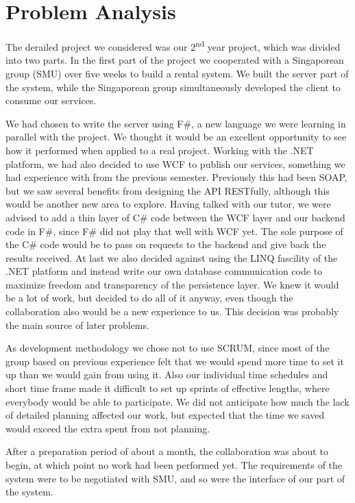 \section{Problem Analysis}
The derailed project we considered was our 2\textsuperscript{nd} year project, which was divided into two parts. In the first part of the project we cooperated with a Singaporean group (SMU) over five weeks to build a rental system. We built the server part of the system, while the Singaporean group simultaneously developed the client to consume our services.

We had chosen to write the server using F\#, a new language we were learning in parallel with the project. We thought it would be an excellent opportunity to see how it performed when applied to a real project.
Working with the .NET platform, we had also decided to use WCF to publish our services, something we had experience with from the previous semester. Previously this had been SOAP, but we saw several benefits from designing the API RESTfully, although this would be another new area to explore.
Having talked with our tutor, we were advised to add a thin layer of C\# code between the WCF layer and our backend code in F\#, since F\# did not play that well with WCF yet. The sole purpose of the C\# code would be to pass on requests to the backend and give back the results received.
At last we also decided against using the LINQ fascility of the .NET platform and instead write our own database communication code to maximize freedom and transparency of the persistence layer.
We knew it would be a lot of work, but decided to do all of it anyway, even though the collaboration also would be a new experience to us. This decision was probably the main source of later problems.

As development methodology we chose not to use SCRUM, since most of the group based on previous experience felt that we would spend more time to set it up than we would gain from using it. Also our individual time schedules and short time frame made it difficult to set up sprints of effective lengths, where everybody would be able to participate. We did not anticipate how much the lack of detailed planning affected our work, but expected that the time we saved would exceed the extra spent from not planning.

After a preparation period of about a month, the collaboration was about to begin, at which point no work had been performed yet. The requirements of the system were to be negotiated with SMU, and so were the interface of our part of the system.

